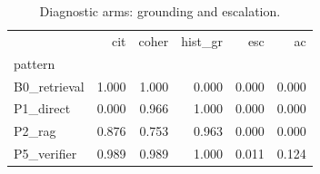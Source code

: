 \begin{table}
\caption{Diagnostic arms: grounding and escalation.}
\label{tab:diag}
\begin{tabular}{lrrrrr}
\toprule
 & cit & coher & hist_gr & esc & ac \\
pattern &  &  &  &  &  \\
\midrule
B0_retrieval & 1.000 & 1.000 & 0.000 & 0.000 & 0.000 \\
P1_direct & 0.000 & 0.966 & 1.000 & 0.000 & 0.000 \\
P2_rag & 0.876 & 0.753 & 0.963 & 0.000 & 0.000 \\
P5_verifier & 0.989 & 0.989 & 1.000 & 0.011 & 0.124 \\
\bottomrule
\end{tabular}
\end{table}
